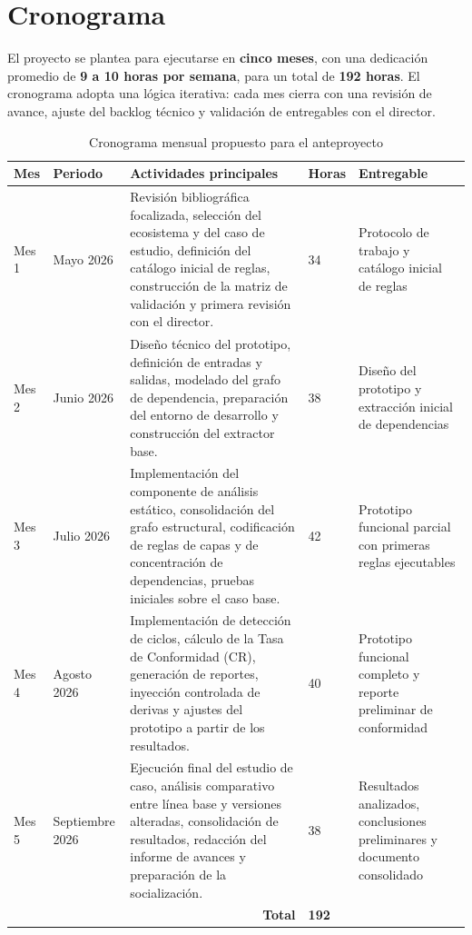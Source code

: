 \section{Cronograma}

El proyecto se plantea para ejecutarse en \textbf{cinco meses}, con una dedicación promedio de \textbf{9 a 10 horas por semana}, para un total de \textbf{192 horas}. El cronograma adopta una lógica iterativa: cada mes cierra con una revisión de avance, ajuste del backlog técnico y validación de entregables con el director.

\begin{table}[H]
  \centering
  \small
  \begin{tabular}{p{1.8cm} p{2.5cm} p{6.6cm} p{1.3cm} p{3cm}}
    \toprule
    \textbf{Mes} & \textbf{Periodo} & \textbf{Actividades principales} & \textbf{Horas} & \textbf{Entregable} \\
    \midrule
    Mes 1 & Mayo 2026 & Revisión bibliográfica focalizada, selección del ecosistema y del caso de estudio, definición del catálogo inicial de reglas, construcción de la matriz de validación y primera revisión con el director. & 34 & Protocolo de trabajo y catálogo inicial de reglas \\
    Mes 2 & Junio 2026 & Diseño técnico del prototipo, definición de entradas y salidas, modelado del grafo de dependencia, preparación del entorno de desarrollo y construcción del extractor base. & 38 & Diseño del prototipo y extracción inicial de dependencias \\
    Mes 3 & Julio 2026 & Implementación del componente de análisis estático, consolidación del grafo estructural, codificación de reglas de capas y de concentración de dependencias, pruebas iniciales sobre el caso base. & 42 & Prototipo funcional parcial con primeras reglas ejecutables \\
    Mes 4 & Agosto 2026 & Implementación de detección de ciclos, cálculo de la Tasa de Conformidad (CR), generación de reportes, inyección controlada de derivas y ajustes del prototipo a partir de los resultados. & 40 & Prototipo funcional completo y reporte preliminar de conformidad \\
    Mes 5 & Septiembre 2026 & Ejecución final del estudio de caso, análisis comparativo entre línea base y versiones alteradas, consolidación de resultados, redacción del informe de avances y preparación de la socialización. & 38 & Resultados analizados, conclusiones preliminares y documento consolidado \\
    \midrule
    \multicolumn{3}{r}{\textbf{Total}} & \textbf{192} & \\
    \bottomrule
  \end{tabular}
  \caption{Cronograma mensual propuesto para el anteproyecto}
\end{table}


